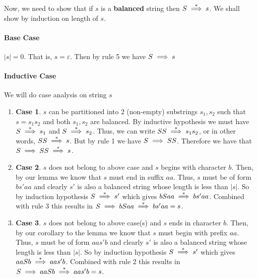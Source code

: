 \begin{soln}
Now, we need to show that if $s$ is a \textbf{balanced} string then $S \stackrel{*}{\implies} s$.
We shall show by induction on length of $s$.

\paragraph{Base Case} $|s| = 0$. That is, $s = \varepsilon$. Then by rule 5 we have $S \implies s$

\paragraph{Inductive Case}
We will do case analysis on string $s$
\begin{enumerate}
    \item \textbf{Case 1}. $s$ can be partitioned into 2 (non-empty) substrings $s_1, s_2$
    such that $s = s_1 s_2$ and both $s_1, s_2$ are balanced.
    By inductive hypothesis we must have $S \stackrel{*}{\implies} s_1$ and $S \stackrel{*}{\implies} s_2$. Thus, we can write
    $SS \stackrel{*}{\implies} s_1 s_2$, or in other words, $SS \stackrel{*}{\implies} s$. But by rule 1 we have $S \implies SS$.
    Therefore we have that $S \implies SS \stackrel{*}{\implies} s$.
    
    \item \textbf{Case 2}. $s$ does not belong to above case and $s$ begins with character $b$.
    Then, by our lemma we know that $s$ must end in suffix $aa$.
    Thus, $s$ must be of form $bs'aa$ and clearly $s'$ is also a balanced string whose length is less than $|s|$.
    So by induction hypothesis $S \stackrel{*}{\implies} s'$ which gives $bSaa \stackrel{*}{\implies} bs'aa$. Combined with rule 3 this
    results in $S \implies bSaa \stackrel{*}{\implies} bs'aa = s$.
    
    \item \textbf{Case 3}. $s$ does not belong to above case(s) and $s$ ends in character $b$.
    Then, by our corollary to the lemma we know that $s$ must begin with prefix $aa$.
    Thus, $s$ must be of form $aas'b$ and clearly $s'$ is also a balanced string whose length is less than $|s|$.
    So by induction hypothesis $S \stackrel{*}{\implies} s'$ which gives $aaSb \stackrel{*}{\implies} aas'b$.
    Combined with rule 2 this results in $S \implies aaSb \stackrel{*}{\implies} aas'b = s$.
    

\end{enumerate}
\end{soln}
